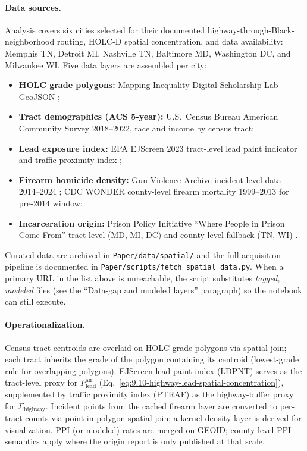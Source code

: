 \paragraph{Data sources.}
Analysis covers six cities selected for their documented highway-through-Black-neighborhood routing, HOLC-D spatial concentration, and data availability: Memphis TN, Detroit MI, Nashville TN, Baltimore MD, Washington DC, and Milwaukee WI. Five data layers are assembled per city:
\begin{itemize}[nosep]
    \item \textbf{HOLC grade polygons:} Mapping Inequality Digital Scholarship Lab GeoJSON \cite{mapping_inequality_dsl};
    \item \textbf{Tract demographics (ACS 5-year):} U.S.\ Census Bureau American Community Survey 2018--2022, race and income by census tract;
    \item \textbf{Lead exposure index:} EPA EJScreen 2023 tract-level lead paint indicator and traffic proximity index \cite{ejscreen_technical};
    \item \textbf{Firearm homicide density:} Gun Violence Archive incident-level data 2014--2024 \cite{gva_methodology}; CDC WONDER county-level firearm mortality 1999--2013 for pre-2014 window;
    \item \textbf{Incarceration origin:} Prison Policy Initiative ``Where People in Prison Come From'' tract-level (MD, MI, DC) and county-level fallback (TN, WI) \cite{ppi_prison_origins}.
\end{itemize}
Curated data are archived in \texttt{Paper/data/spatial/} and the full acquisition pipeline is documented in \texttt{Paper/scripts/fetch\_spatial\_data.py}. When a primary URL in the list above is unreachable, the script substitutes \emph{tagged, modeled} files (see the ``Data-gap and modeled layers'' paragraph) so the notebook can still execute.

\paragraph{Operationalization.}
Census tract centroids are overlaid on HOLC grade polygons via spatial join; each tract inherits the grade of the polygon containing its centroid (lowest-grade rule for overlapping polygons). EJScreen lead paint index (LDPNT) serves as the tract-level proxy for $P_{\text{lead}}^{\text{air}}$ (Eq.~\ref{eq:9.10-highway-lead-spatial-concentration}), supplemented by traffic proximity index (PTRAF) as the highway-buffer proxy for $\Sigma_{\text{highway}}$. Incident points from the cached firearm layer are converted to per-tract counts via point-in-polygon spatial join; a kernel density layer is derived for visualization. PPI (or modeled) rates are merged on GEOID; county-level PPI semantics apply where the origin report is only published at that scale.

